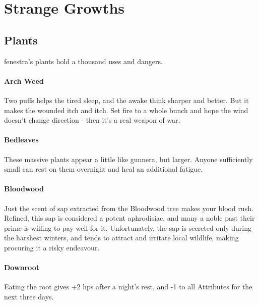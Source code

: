 \chapter{Strange Growths}

\section{Plants}
\label{plants}

\begin{multicols}{2}

\noindent
\Gls{fenestra}'s plants hold a thousand uses and dangers.

\subsubsection{Arch Weed}
\label{arch_weed}

Two puffs helps the tired sleep, and the awake think sharper and better.
But it makes the wounded itch and itch.
Set fire to a whole bunch and hope the wind doesn't change direction - then it's a real weapon of war.

\subsubsection{Bedleaves}
\label{bedleaves}

These massive plants appear a little like gunnera, but larger.
Anyone sufficiently small can rest on them overnight and heal an additional \gls{fatigue}.

\subsubsection{Bloodwood}
\label{bloodwood}

Just the scent of sap extracted from the Bloodwood tree makes your blood rush. Refined, this sap is considered a potent aphrodisiac, 
and many a noble past their prime is willing to pay well for it. Unfortunately, the sap is secreted only during the harshest winters, 
and tends to attract and irritate local wildlife, making procuring it a risky endeavour.

\subsubsection{Downroot}
\label{downroot}

Eating the root gives +2 \glspl{hp} after a night's rest, and -1 to all Attributes for the next three days.


\end{multicols}
